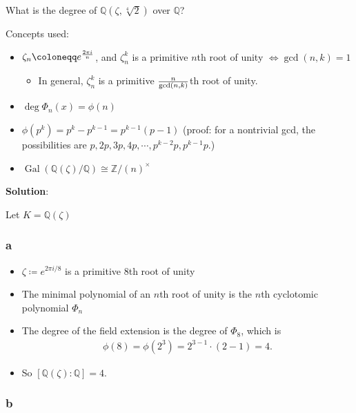 What is the degree of \({\mathbb{Q}}(\zeta, \sqrt[4] 2)\) over
\({\mathbb{Q}}\)?

\begin{solution}

Concepts used:

\begin{itemize}
\tightlist
\item
  \(\zeta_n \coloneqq e^{2\pi i \over n}\), and \(\zeta_n^k\) is a
  primitive \(n\)th root of unity \(\iff \gcd(n, k) = 1\)

  \begin{itemize}
  \tightlist
  \item
    In general, \(\zeta_n^k\) is a primitive \({n \over \gcd(n, k)}\)th
    root of unity.
  \end{itemize}
\item
  \(\deg \Phi_n(x) = \phi(n)\)
\item
  \(\phi(p^k) = p^k - p^{k-1} = p^{k-1}(p-1)\) (proof: for a nontrivial
  gcd, the possibilities are
  \(p, 2p, 3p, 4p, \cdots, p^{k-2}p, p^{k-1}p\).)
\item
  \(\operatorname{Gal}({\mathbb{Q}}(\zeta)/{\mathbb{Q}}) \cong {\mathbb{Z}}/(n)^{\times}\)
\end{itemize}

\textbf{Solution}:

Let \(K = {\mathbb{Q}}(\zeta)\)

\hypertarget{a-56}{%
\subsubsection{a}\label{a-56}}

\begin{itemize}
\tightlist
\item
  \(\zeta \coloneqq e^{2\pi i / 8}\) is a primitive \(8\)th root of
  unity
\item
  The minimal polynomial of an \(n\)th root of unity is the \(n\)th
  cyclotomic polynomial \(\Phi_n\)
\item
  The degree of the field extension is the degree of \(\Phi_8\), which
  is
  \begin{align*}
  \phi(8) = \phi(2^3) = 2^{3-1} \cdot (2-1) = 4
  .\end{align*}
\item
  So \([{\mathbb{Q}}(\zeta): {\mathbb{Q}}] = 4\).
\end{itemize}

\hypertarget{b-46}{%
\subsubsection{b}\label{b-46}}


\end{solution}
